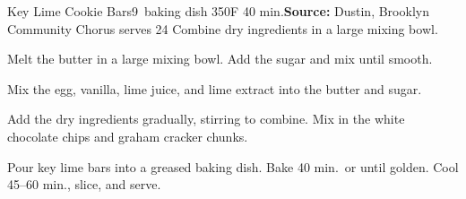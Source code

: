 \begin{recipe}{Key Lime Cookie Bars}{9\inch{}\inch\ baking dish \hfill 350\0F \hfill 40 min.}{\textbf{Source:} Dustin, Brooklyn Community Chorus \hfill serves 24}
 Combine dry ingredients in a large mixing bowl.

 Melt the butter in a large mixing bowl. Add the sugar and mix until smooth.

 Mix the egg, vanilla, lime juice, and lime extract into the butter and sugar.

 Add the dry ingredients gradually, stirring to combine. Mix in the white chocolate chips and graham cracker chunks.

 \newstep Pour key lime bars into a greased baking dish. Bake 40 min.\ or until golden. Cool 45--60 min., slice, and serve.

\end{recipe}

